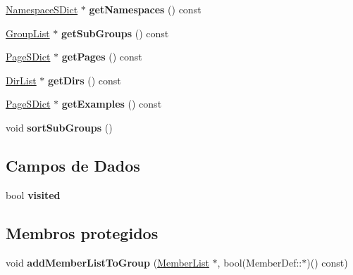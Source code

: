 \begin{DoxyCompactItemize}
\item 
\hypertarget{class_group_def_a8d8ad3bfd0a1e3f5ae6fb57eb11a6823}{\hyperlink{class_namespace_s_dict}{Namespace\-S\-Dict} $\ast$ {\bfseries get\-Namespaces} () const }\label{class_group_def_a8d8ad3bfd0a1e3f5ae6fb57eb11a6823}

\item 
\hypertarget{class_group_def_ad68ce7e3a3d46bf7e8d25bef20122374}{\hyperlink{class_group_list}{Group\-List} $\ast$ {\bfseries get\-Sub\-Groups} () const }\label{class_group_def_ad68ce7e3a3d46bf7e8d25bef20122374}

\item 
\hypertarget{class_group_def_aba178af288e8cb8e4b21582ba441cc6f}{\hyperlink{class_page_s_dict}{Page\-S\-Dict} $\ast$ {\bfseries get\-Pages} () const }\label{class_group_def_aba178af288e8cb8e4b21582ba441cc6f}

\item 
\hypertarget{class_group_def_ab7716fa327041be925cae6e9ac3fb749}{\hyperlink{class_dir_list}{Dir\-List} $\ast$ {\bfseries get\-Dirs} () const }\label{class_group_def_ab7716fa327041be925cae6e9ac3fb749}

\item 
\hypertarget{class_group_def_af2f4d2ea055393d3fe420136aaafb9e2}{\hyperlink{class_page_s_dict}{Page\-S\-Dict} $\ast$ {\bfseries get\-Examples} () const }\label{class_group_def_af2f4d2ea055393d3fe420136aaafb9e2}

\item 
\hypertarget{class_group_def_a19852fdd7293315e076d664b8ad0b46d}{void {\bfseries sort\-Sub\-Groups} ()}\label{class_group_def_a19852fdd7293315e076d664b8ad0b46d}

\end{DoxyCompactItemize}
\subsection*{Campos de Dados}
\begin{DoxyCompactItemize}
\item 
\hypertarget{class_group_def_a1df99df902f5f6e81ec3e21e9c07360e}{bool {\bfseries visited}}\label{class_group_def_a1df99df902f5f6e81ec3e21e9c07360e}

\end{DoxyCompactItemize}
\subsection*{Membros protegidos}
\begin{DoxyCompactItemize}
\item 
\hypertarget{class_group_def_a192469bf9fb535cd184b156defd3714a}{void {\bfseries add\-Member\-List\-To\-Group} (\hyperlink{class_member_list}{Member\-List} $\ast$, bool(Member\-Def\-::$\ast$)() const)}\label{class_group_def_a192469bf9fb535cd184b156defd3714a}

\end{DoxyCompactItemize}
